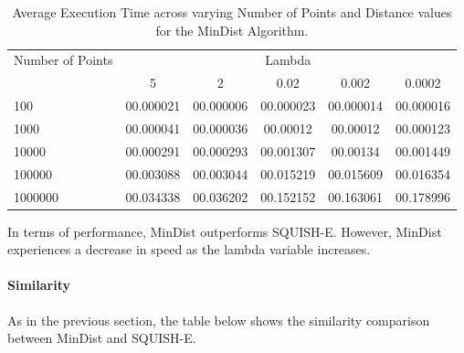 \begin{table}
    \centering
    \label{tab:execution_time_mindist}
    \begin{tabular}{@{}lccccc@{}}
        \toprule
        Number of Points & \multicolumn{5}{c}{Lambda} \\
        \cmidrule{2-6}
        & 5         & 2       & 0.02        & 0.002       & 0.0002       \\
        \midrule
        100              & 00.000021 & 00.000006 & 00.000023 & 00.000014 & 00.000016 \\
        1000             & 00.000041  & 00.000036 & 00.00012 & 00.00012 & 00.000123 \\
        10000            & 00.000291 & 00.000293 & 00.001307 & 00.00134 & 00.001449 \\
        100000           & 00.003088  & 00.003044  & 00.015219 & 00.015609 & 00.016354 \\
        1000000          & 00.034338 & 00.036202 & 00.152152 & 00.163061 & 00.178996 \\
        \bottomrule
    \end{tabular}
    \caption{Average Execution Time across varying Number of Points and Distance values for the MinDist Algorithm.}
\end{table}

In terms of performance, MinDist outperforms SQUISH-E. However, MinDist experiences a decrease in speed as the lambda variable increases.

\paragraph{Similarity}
As in the previous section, the table below shows the similarity comparison between MinDist and SQUISH-E.

